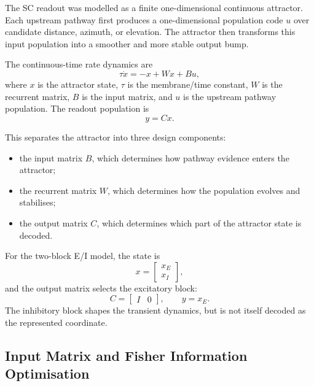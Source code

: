 The SC readout was modelled as a finite one-dimensional continuous attractor. Each upstream pathway first produces a one-dimensional population code $u$ over candidate distance, azimuth, or elevation. The attractor then transforms this input population into a smoother and more stable output bump.

The continuous-time rate dynamics are
\begin{equation}
    \tau \dot{x}
    =
    -x + Wx + Bu,
\end{equation}
where $x$ is the attractor state, $\tau$ is the membrane/time constant, $W$ is the recurrent matrix, $B$ is the input matrix, and $u$ is the upstream pathway population. The readout population is
\begin{equation}
    y = Cx.
\end{equation}

This separates the attractor into three design components:
\begin{itemize}
    \item the input matrix $B$, which determines how pathway evidence enters the attractor;
    \item the recurrent matrix $W$, which determines how the population evolves and stabilises;
    \item the output matrix $C$, which determines which part of the attractor state is decoded.
\end{itemize}

For the two-block E/I model, the state is
\begin{equation}
    x =
    \begin{bmatrix}
        x_E\\
        x_I
    \end{bmatrix},
\end{equation}
and the output matrix selects the excitatory block:
\begin{equation}
    C =
    \begin{bmatrix}
        I & 0
    \end{bmatrix},
    \qquad
    y = x_E.
\end{equation}
The inhibitory block shapes the transient dynamics, but is not itself decoded as the represented coordinate.

\subsection{Input Matrix and Fisher Information Optimisation}

